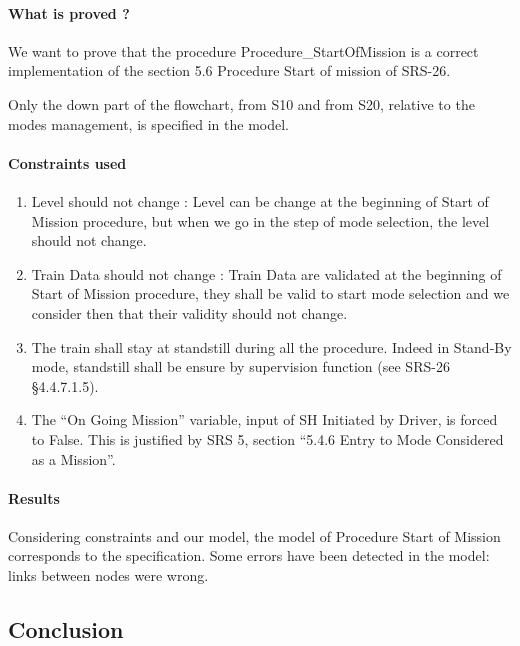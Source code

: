 \paragraph{What is proved ?}
We want to prove that the procedure Procedure\_StartOfMission is a
correct implementation of the section 5.6 Procedure Start of mission of SRS-26.

Only the down part of the flowchart, from S10 and from S20, relative to the modes management, is specified in the \SCADE{} model.





\paragraph{Constraints used}
\begin{enumerate}
\item Level should not change : Level can be change at the beginning of Start of Mission procedure, but when we go in the step of mode selection, the level should not change.

\item Train Data should not change : Train Data are validated at the beginning of Start of Mission procedure, they shall be valid to start mode selection and we consider then that  their validity should not change.

\item The train shall stay at standstill during all the procedure. Indeed in Stand-By mode, standstill shall be ensure by supervision function (see SRS-26 §4.4.7.1.5).

\item The ``On Going Mission'' variable, input of SH Initiated by Driver, is
forced to False. This is justified by SRS 5, section ``5.4.6 Entry to
Mode Considered as a Mission''.
\end{enumerate}



\paragraph{Results}
Considering constraints and our \HLL{} model, the \SCADE{} model of Procedure
Start of Mission corresponds to the specification.
Some errors have been detected in the \SCADE{} model: links between nodes were wrong.


\subsection{Conclusion}




